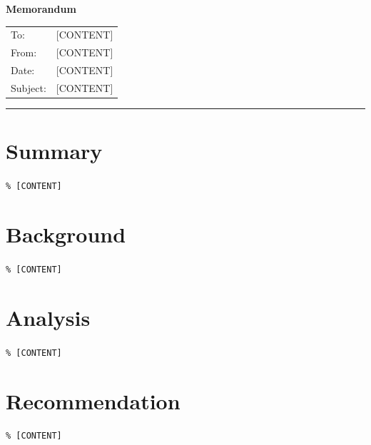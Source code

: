 \documentclass[11pt,a4paper]{scrartcl}
\begin{document}
{\Large\bfseries Memorandum\par}\vspace{.8em}
\begin{tabularx}{\linewidth}{@{}p{22mm}X@{}}To:&[CONTENT]\\From:&[CONTENT]\\Date:&[CONTENT]\\Subject:&[CONTENT]\end{tabularx}
\vspace{1em}\hrule\vspace{.8em}
\section*{Summary}\texttt{\% [CONTENT]}
\section*{Background}\texttt{\% [CONTENT]}
\section*{Analysis}\texttt{\% [CONTENT]}
\section*{Recommendation}\texttt{\% [CONTENT]}
\end{document}
